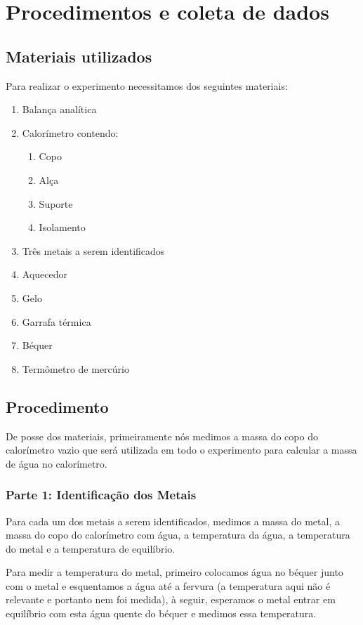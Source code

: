\documentclass[a4paper]{article}
\begin{document}
	\section{Procedimentos e coleta de dados}

		\subsection{Materiais utilizados}
			Para realizar o experimento necessitamos dos seguintes materiais:
			\begin{enumerate}
				\item Balança analítica 
				\item Calorímetro contendo:

				\begin{enumerate}
					\item Copo 
					\item Alça 
					\item Suporte 
					\item Isolamento 
				\end{enumerate}
				\item Três metais a serem identificados 
				\item Aquecedor 
				\item Gelo 
				\item Garrafa térmica 
				\item Béquer 
				\item Termômetro de mercúrio 
			\end{enumerate}

		\subsection{Procedimento}

			De posse dos materiais, primeiramente nós medimos a massa do copo
			do calorímetro vazio que será utilizada em todo o experimento para
			calcular a massa de água no calorímetro.

		\subsubsection{Parte 1: Identificação dos Metais}

			Para cada um dos metais a serem identificados, medimos a massa do
			metal, a massa do copo do calorímetro com água, a temperatura da água,
			a temperatura do metal e a temperatura de equilíbrio.

			Para medir a temperatura do metal, primeiro colocamos água no béquer
			junto com o metal e esquentamos a água até a fervura (a temperatura
			aqui não é relevante e portanto nem foi medida), à seguir, esperamos
			o metal entrar em equilíbrio com esta água quente do béquer e medimos
			essa temperatura.
\end{document}
